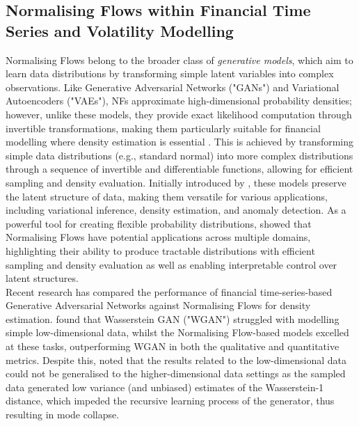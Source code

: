 \documentclass[oneside,12pt]{CUEDthesisPSnPDF}
\newcommand{\textcite}{\citet}
\newcommand{\parencite}{\citep}
\begin{document}
\subsection{Normalising Flows within Financial Time Series and Volatility Modelling}
\noindent 
Normalising Flows belong to the broader class of \textit{generative models}, which aim to learn data distributions by transforming simple latent variables into complex observations. Like Generative Adversarial Networks ("GANs") and Variational Autoencoders ("VAEs"), NFs approximate high-dimensional probability densities; however, unlike these models, they provide exact likelihood computation through invertible transformations, making them particularly suitable for financial modelling where density estimation is essential \parencite{rezende2015variational}. This is achieved by  transforming simple data distributions (e.g., standard normal) into more complex distributions through a sequence of invertible and differentiable functions, allowing for efficient sampling and density evaluation. Initially introduced by \textcite{rezende2015variational}, these models preserve the latent structure of data, making them versatile for various applications, including variational inference, density estimation, and anomaly detection. As a powerful tool for creating flexible probability distributions, \textcite{kobyzev2020normalising} showed that Normalising Flows have potential applications across multiple domains, highlighting their ability to produce tractable distributions with efficient sampling and density evaluation as well as enabling interpretable control over latent structures.\\

Recent research has compared the performance of financial time-series-based Generative Adversarial Networks against Normalising Flows for density estimation. \textcite{liu2020flows} found that Wasserstein GAN ("WGAN") struggled with modelling simple low-dimensional data, whilst the Normalising Flow-based models excelled at these tasks, outperforming WGAN in both the qualitative and quantitative metrics. Despite this, \textcite{liu2020flows} noted that the results related to the low-dimensional data could not be generalised to the higher-dimensional data settings as the sampled data generated low variance (and unbiased) estimates of the Wasserstein-1 distance, which impeded the recursive learning process of the generator, thus resulting in mode collapse.  \\
\end{document}
